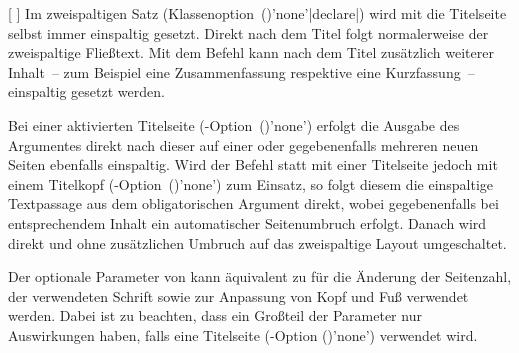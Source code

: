 \begin{Declaration*}{}
\begin{Declaration*}{}
\begin{Declaration*}{}
\begin{Declaration}{%
  [%
  ]%
}
\printdeclarationlist%
%
%
%
Im zweispaltigen Satz 
(Klassenoption~()'none'|declare|) wird mit 
 die Titelseite selbst immer einspaltig gesetzt. Direkt nach 
dem Titel folgt normalerweise der zweispaltige Fließtext. Mit dem Befehl 
 kann nach dem Titel zusätzlich weiterer Inhalt~-- 
zum Beispiel eine Zusammenfassung respektive eine Kurzfassung~-- einspaltig 
gesetzt werden.

Bei einer aktivierten Titelseite 
(\KOMAScript-Option~()'none') 
erfolgt die Ausgabe des Argumentes  direkt nach 
dieser auf einer oder gegebenenfalls mehreren neuen Seiten ebenfalls 
einspaltig. Wird der Befehl  statt mit einer 
Titelseite jedoch mit einem Titelkopf 
(\KOMAScript-Option~()'none') zum 
Einsatz, so folgt diesem die einspaltige Textpassage aus dem obligatorischen 
Argument direkt, wobei gegebenenfalls bei entsprechendem Inhalt ein 
automatischer Seitenumbruch erfolgt. Danach wird direkt und ohne zusätzlichen 
Umbruch auf das zweispaltige Layout umgeschaltet.

Der optionale Parameter von  kann äquivalent zu 
 für die Änderung der Seitenzahl, der verwendeten Schrift 
sowie zur Anpassung von Kopf und Fuß verwendet werden. Dabei ist zu beachten, 
dass ein Großteil der Parameter nur Auswirkungen haben, falls eine Titelseite
(\KOMAScript-Option ()'none') 
verwendet wird.
\end{Declaration}


\end{Declaration*}
\end{Declaration*}
\end{Declaration*}
